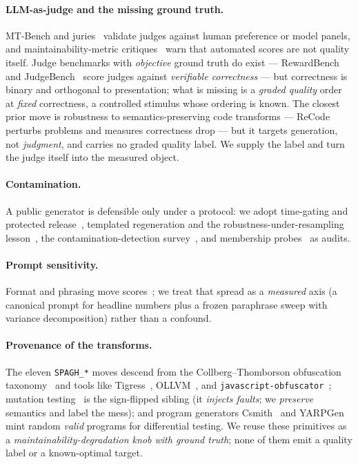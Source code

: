 \documentclass[11pt]{article}
\begin{document}
\paragraph{LLM-as-judge and the missing ground truth.} MT-Bench and
juries~\citep{zheng-etal-2023-judging,verga-etal-2024-replacing} validate judges against human preference or
model panels, and maintainability-metric critiques~\citep{vandeursen-2014-think}
warn that automated scores are not quality itself. Judge benchmarks with \emph{objective}
ground truth do exist --- RewardBench~\citep{lambert-etal-2024-rewardbench} and
JudgeBench~\citep{tan-etal-2025-judgebench} score judges against \emph{verifiable
correctness} --- but correctness is binary and orthogonal to presentation; what is missing
is a \emph{graded quality} order at \emph{fixed} correctness, a controlled stimulus whose
ordering is known. The closest prior move is robustness to semantics-preserving
code transforms --- ReCode~\citep{wang-etal-2023-recode} perturbs problems and measures
correctness drop --- but it targets generation, not \emph{judgment}, and carries no graded
quality label. We supply the label and turn the judge itself into the measured object.
\paragraph{Contamination.} A public generator is defensible only under a protocol: we
adopt time-gating and protected
release~\citep{jacovi-etal-2023-stop,jain-etal-2025-livecodebench}, templated regeneration and
the robustness-under-resampling lesson~\citep{mirzadeh-etal-2024-gsm,zhu-etal-2024-dyval}, the
contamination-detection survey~\citep{ravaut-etal-2024-comprehensive}, and membership
probes~\citep{shi-etal-2024-detecting} as audits.
\paragraph{Prompt sensitivity.} Format and phrasing move
scores~\citep{liang-etal-2023-holistic,zhu-etal-2023-promptrobust,sclar-etal-2024-quantifying}; we treat that spread
as a \emph{measured} axis (a canonical prompt for headline numbers plus a frozen
paraphrase sweep with variance decomposition) rather than a confound.
\paragraph{Provenance of the transforms.} The eleven \texttt{SPAGH\_*} moves descend from
the Collberg--Thomborson obfuscation
taxonomy~\citep{collberg-etal-1997-taxonomy,collberg-etal-1998-manufacturing} and tools like
Tigress~\citep{collberg-2015-tigress}, OLLVM~\citep{junod-etal-2015-obfuscator}, and
\texttt{javascript-obfuscator}~\citep{kachalov-2016-javascript}; mutation
testing~\citep{demillo-etal-1978-hints,jia-harman-2011-analysis} is the sign-flipped sibling (it
\emph{injects faults}; we \emph{preserve} semantics and label the mess); and program
generators Csmith~\citep{yang-etal-2011-finding} and YARPGen~\citep{livinskii-etal-2020-random} mint random
\emph{valid} programs for differential testing. We reuse these primitives as a
\emph{maintainability-degradation knob with ground truth}; none of them emit a quality
label or a known-optimal target.
\end{document}
